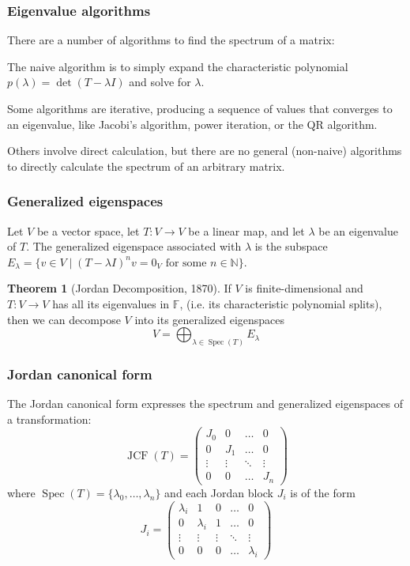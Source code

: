 \documentclass{beamer}
\newcommand{\N}{\mathbb{N}}
\DeclareMathOperator{\Spec}{Spec}
\theoremstyle{definition}
\newtheorem*{theorem*}{Theorem}
\begin{document}
\begin{frame}
    \frametitle{Eigenvalue algorithms}

    There are a number of algorithms to find the spectrum of a matrix:

    \pause
    The naive algorithm is to simply expand the characteristic polynomial $p(\lambda) = \det(T - \lambda I)$ and solve for $\lambda$.

    \pause
    Some algorithms are iterative, producing a sequence of values that converges to an eigenvalue, like Jacobi's algorithm, power iteration, or the QR algorithm.

    \pause
    Others involve direct calculation, but there are no general (non-naive) algorithms to directly calculate the spectrum of an arbitrary matrix.
\end{frame}

\begin{frame}
    \frametitle{Generalized eigenspaces}

    \begin{definition}
        Let $V$ be a vector space, let $T: V \longrightarrow V$ be a linear map, and let $\lambda$ be an eigenvalue of $T$.
        The generalized eigenspace associated with $\lambda$ is the subspace $E_\lambda = \{v \in V \mid (T - \lambda I)^n v = 0_V \text{ for some } n \in \N\}$.
    \end{definition}
    \begin{theorem*}[Jordan Decomposition, 1870]
        If $V$ is finite-dimensional and $T: V \longrightarrow V$ has all its eigenvalues in $\mathbb{F}$, (i.e. its characteristic polynomial splits), then
        we can decompose $V$ into its generalized eigenspaces
        \[
            V = \bigoplus_{\lambda \in \Spec(T)} E_\lambda  
        \]
    \end{theorem*}
\end{frame}

\begin{frame}
    \frametitle{Jordan canonical form}
    The Jordan canonical form expresses the spectrum and generalized eigenspaces of a transformation:
    \[
        \operatorname{JCF}(T) = \begin{pmatrix}
            J_0 & 0 & \ldots & 0 \\
            0 & J_1 & \ldots & 0 \\
            \vdots & \vdots & \ddots & \vdots \\
            0 & 0 & \ldots & J_n
        \end{pmatrix}
    \]
    where $\Spec(T) = \{\lambda_0, \ldots, \lambda_n\}$ and each Jordan block $J_i$ is of the form
    \[
        J_i = \begin{pmatrix}
            \lambda_i & 1 & 0 & \ldots & 0 \\
            0 & \lambda_i & 1 & \ldots & 0 \\
            \vdots & \vdots & \vdots & \ddots & \vdots \\
            0 & 0 & 0 & \ldots & \lambda_i
        \end{pmatrix}
    \]
\end{frame}
\end{document}
